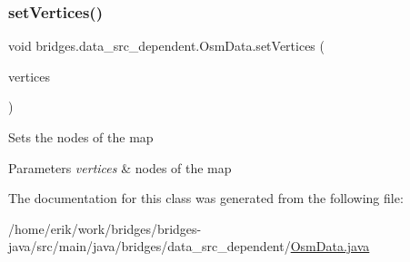 \subsubsection{\texorpdfstring{set\+Vertices()}{setVertices()}}
{\footnotesize\ttfamily void bridges.\+data\+\_\+src\+\_\+dependent.\+Osm\+Data.\+set\+Vertices (\begin{DoxyParamCaption}\item[{\hyperlink{classbridges_1_1data__src__dependent_1_1_osm_vertex}{Osm\+Vertex} \mbox{[}$\,$\mbox{]}}]{vertices }\end{DoxyParamCaption})}

Sets the nodes of the map 
\begin{DoxyParams}{Parameters}
{\em vertices} & nodes of the map \\
\hline
\end{DoxyParams}


The documentation for this class was generated from the following file\+:\begin{DoxyCompactItemize}
\item 
/home/erik/work/bridges/bridges-\/java/src/main/java/bridges/data\+\_\+src\+\_\+dependent/\hyperlink{_osm_data_8java}{Osm\+Data.\+java}\end{DoxyCompactItemize}
